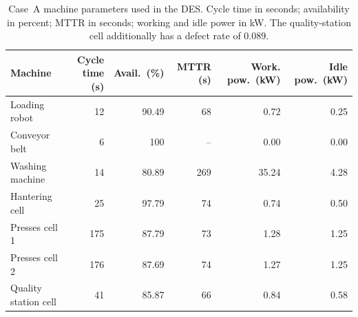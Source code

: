 \documentclass[a4paper,fleqn]{cas-sc}
\begin{document}
  \begin{table}[ ]                                                                                                  
  \centering                                                                                                            
  \caption{Case~A machine parameters used in the DES. Cycle time in seconds; availability in percent; MTTR in seconds;  
  working and idle power in kW. The quality-station cell additionally has a defect rate of $0.089$.}                    
  \label{tab:machine_params}                                                                                            
  \begin{tabular}{@{}l r r r r r@{}}                                                                                    
  \toprule                                                                                                              
  \textbf{Machine} & \textbf{Cycle time (s)} & \textbf{Avail.\ (\%)} & \textbf{MTTR (s)} & \textbf{Work. pow.\ (kW)} &  
  \textbf{Idle pow.\ (kW)} \\                                                                                           
  \midrule                                                                                                              
  Loading robot        & 12   & 90.49 & 68  & 0.72  & 0.25 \\                                                           
  Conveyor belt        & 6    & 100   & --  & 0.00  & 0.00 \\                                                           
  Washing machine      & 14   & 80.89 & 269 & 35.24 & 4.28 \\                                                           
  Hantering cell       & 25   & 97.79 & 74  & 0.74  & 0.50 \\                                                           
  Presses cell 1       & 175  & 87.79 & 73  & 1.28  & 1.25 \\                                                           
  Presses cell 2       & 176  & 87.69 & 74  & 1.27  & 1.25 \\                                                           
  Quality station cell & 41   & 85.87 & 66  & 0.84  & 0.58 \\                                                           
  \bottomrule                                                                                                           
  \end{tabular}                                                                                                         
  \end{table}                                                                                                           
                                                                                                                        
\end{document}

